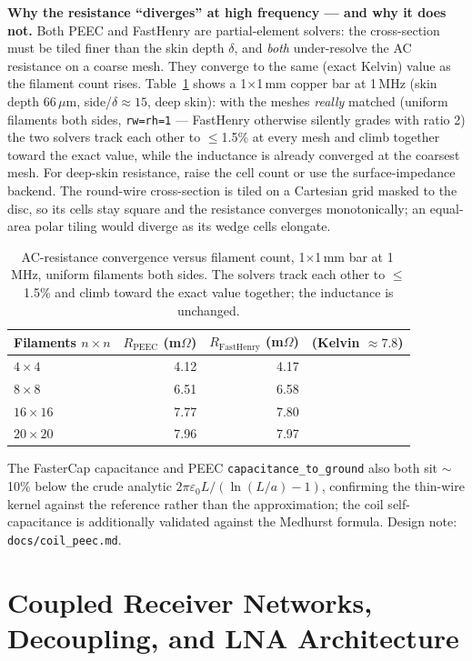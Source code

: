 \documentclass[11pt,oneside]{report}
\newcommand{\code}[1]{\texttt{#1}}
\begin{document}
\textbf{Why the resistance ``diverges'' at high frequency --- and why it does not.} Both
PEEC and FastHenry are partial-element solvers: the cross-section must be tiled finer than
the skin depth \(\delta\), and \emph{both} under-resolve the AC resistance on a coarse mesh.
They converge to the same (exact Kelvin) value as the filament count rises.
Table~\ref{tab:peec-Rconv} shows a 1\(\times\)1\,mm copper bar at 1\,MHz (skin depth
66\,\(\mu\)m, side/\(\delta\approx15\), deep skin): with the meshes \emph{really} matched
(uniform filaments both sides, \code{rw=rh=1} --- FastHenry otherwise silently grades with
ratio 2) the two solvers track each other to \(\le\)1.5\% at every mesh and climb together
toward the exact value, while the inductance is already converged at the coarsest mesh. For
deep-skin resistance, raise the cell count or use the surface-impedance backend. The
round-wire cross-section is tiled on a Cartesian grid masked to the disc, so its cells stay
square and the resistance converges monotonically; an equal-area polar tiling would diverge
as its wedge cells elongate.

\begin{table}[h]
\centering
\small
\begin{tabular}{@{}lrrr@{}}
\toprule
Filaments \(n\times n\) & \(R_{\text{PEEC}}\) (m\(\Omega\)) & \(R_{\text{FastHenry}}\) (m\(\Omega\)) & (Kelvin \(\approx7.8\)) \\
\midrule
\(4\times4\)   & 4.12 & 4.17 & \\
\(8\times8\)   & 6.51 & 6.58 & \\
\(16\times16\) & 7.77 & 7.80 & \\
\(20\times20\) & 7.96 & 7.97 & \\
\bottomrule
\end{tabular}
\caption{AC-resistance convergence versus filament count, 1\(\times\)1\,mm bar at 1\,MHz,
uniform filaments both sides. The solvers track each other to \(\le\)1.5\% and climb toward
the exact value together; the inductance is unchanged.}
\label{tab:peec-Rconv}
\end{table}

The FasterCap capacitance and PEEC \code{capacitance\_to\_ground} also both sit \(\sim\)10\%
below the crude analytic \(2\pi\varepsilon_0 L/(\ln(L/a)-1)\), confirming the thin-wire
kernel against the reference rather than the approximation; the coil self-capacitance is
additionally validated against the Medhurst formula. Design note: \code{docs/coil\_peec.md}.

\section{Coupled Receiver Networks, Decoupling, and LNA Architecture}
\label{sec:receiver-networks}
\end{document}
